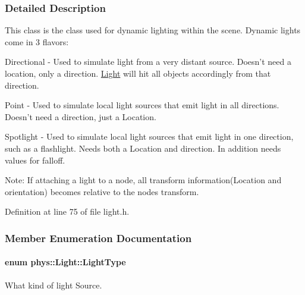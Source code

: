 \subsubsection{Detailed Description}
This class is the class used for dynamic lighting within the scene. Dynamic lights come in 3 flavors: \par
 Directional -\/ Used to simulate light from a very distant source. Doesn't need a location, only a direction. \hyperlink{classphys_1_1Light}{Light} will hit all objects accordingly from that direction. \par
 Point -\/ Used to simulate local light sources that emit light in all directions. Doesn't need a direction, just a Location. \par
 Spotlight -\/ Used to simulate local light sources that emit light in one direction, such as a flashlight. Needs both a Location and direction. In addition needs values for falloff. \par
 Note: If attaching a light to a node, all transform information(Location and orientation) becomes relative to the nodes transform. 

Definition at line 75 of file light.h.



\subsubsection{Member Enumeration Documentation}
\hypertarget{classphys_1_1Light_aef1be63d57f59f33bf4c66be797009bf}{
\paragraph[{LightType}]{\setlength{\rightskip}{0pt plus 5cm}enum {\bf phys::Light::LightType}}\hfill}
\label{classphys_1_1Light_aef1be63d57f59f33bf4c66be797009bf}


What kind of light Source. 


